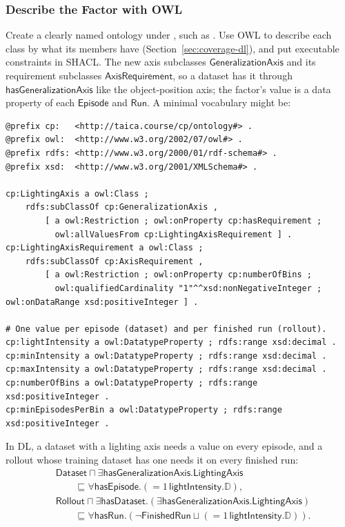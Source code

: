 \documentclass[11pt]{article}
\DeclareRobustCommand{\code}{\codeurl}  %
\begin{document}
\subsubsection{Describe the Factor with OWL}

Create a clearly named ontology under , such as \code{lighting.ttl}. Use OWL to describe each class
by what its members have (Section~\ref{sec:coverage-dl}), and put executable constraints in SHACL. The new axis
subclasses \(\mathsf{GeneralizationAxis}\) and its requirement subclasses \(\mathsf{AxisRequirement}\), so a dataset
has it through \(\mathsf{hasGeneralizationAxis}\) like the object-position axis; the factor's value is a data property
of each \(\mathsf{Episode}\) and \(\mathsf{Run}\). A minimal vocabulary might be:

\begin{lstlisting}[language=turtle]
@prefix cp:   <http://taica.course/cp/ontology#> .
@prefix owl:  <http://www.w3.org/2002/07/owl#> .
@prefix rdfs: <http://www.w3.org/2000/01/rdf-schema#> .
@prefix xsd:  <http://www.w3.org/2001/XMLSchema#> .

cp:LightingAxis a owl:Class ;
    rdfs:subClassOf cp:GeneralizationAxis ,
        [ a owl:Restriction ; owl:onProperty cp:hasRequirement ;
          owl:allValuesFrom cp:LightingAxisRequirement ] .
cp:LightingAxisRequirement a owl:Class ;
    rdfs:subClassOf cp:AxisRequirement ,
        [ a owl:Restriction ; owl:onProperty cp:numberOfBins ;
          owl:qualifiedCardinality "1"^^xsd:nonNegativeInteger ; owl:onDataRange xsd:positiveInteger ] .

# One value per episode (dataset) and per finished run (rollout).
cp:lightIntensity a owl:DatatypeProperty ; rdfs:range xsd:decimal .
cp:minIntensity a owl:DatatypeProperty ; rdfs:range xsd:decimal .
cp:maxIntensity a owl:DatatypeProperty ; rdfs:range xsd:decimal .
cp:numberOfBins a owl:DatatypeProperty ; rdfs:range xsd:positiveInteger .
cp:minEpisodesPerBin a owl:DatatypeProperty ; rdfs:range xsd:positiveInteger .
\end{lstlisting}

In DL, a dataset with a lighting axis needs a value on every episode, and a rollout whose training dataset has one
needs it on every finished run:
\[
\begin{aligned}
&\mathsf{Dataset}\sqcap\exists\mathsf{hasGeneralizationAxis}.\mathsf{LightingAxis}\\
  &\qquad\sqsubseteq \forall\mathsf{hasEpisode}.({=}1\,\mathsf{lightIntensity}.\mathbb{D}),\\
&\mathsf{Rollout}\sqcap\exists\mathsf{hasDataset}.(\exists\mathsf{hasGeneralizationAxis}.\mathsf{LightingAxis})\\
  &\qquad\sqsubseteq \forall\mathsf{hasRun}.(\neg\mathsf{FinishedRun}\sqcup({=}1\,\mathsf{lightIntensity}.\mathbb{D})).
\end{aligned}
\]
\end{document}
